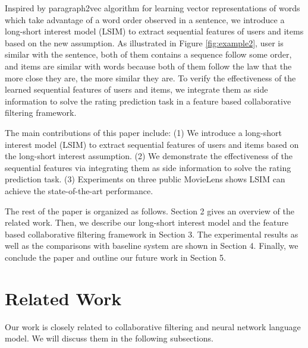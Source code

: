 \documentclass{llncs}
\begin{document}
Inspired by paragraph2vec algorithm \cite{le2014distributed} for
learning vector representations of words which take advantage of
a word order observed in a sentence,
we introduce a long-short interest model (LSIM) to extract sequential features
of users and items based on the new assumption.
As illustrated in Figure \ref{fig:example2}, user is similar with the sentence,
both of them contains a sequence follow some order,
and items are similar with words because both of them follow the law
that the more close they are, the more similar they are.
To verify the effectiveness of the learned sequential features of users
and items, we integrate them as side information to solve the rating prediction task
in a feature based collaborative filtering framework.

The main contributions of this paper include:
(1) We introduce a long-short interest model (LSIM) to extract sequential features
of users and items based on the long-short interest assumption.
(2) We demonstrate the effectiveness of the sequential features
via integrating them as side information to solve the rating prediction task.
(3) Experiments on three public MovieLens shows LSIM can achieve the state-of-the-art performance.

The rest of the paper is organized as follows. Section 2 gives an overview of the related work.
Then, we describe our long-short interest model and the feature based collaborative filtering
framework in Section 3. The experimental results as well as the comparisons with
baseline system are shown in Section 4.
Finally, we conclude the paper and outline our future work in Section 5.

\section{Related Work}
Our work is closely related to collaborative filtering and
neural network language model.
We will discuss them in the following subsections.
\end{document}

